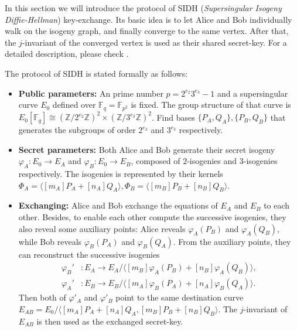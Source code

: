 

In this section we will introduce the protocol of SIDH (\textit{Supersingular Isogeny Diffie-Hellman}) key-exchange. Its basic idea is to let Alice and Bob individually walk on the isogeny graph, and finally converge to the same vertex. After that, the $j$-invariant of the converged vertex is used as their shared secret-key. For a detailed description, please check \cite{PQCRYPTO:JaoDeFo11}.

\begin{protocol}[SIDH] The protocol of SIDH is stated formally as follows:
\begin{itemize}
    \item \textbf{Public parameters: }An prime number $p=2^{e_2}3^{e_3}-1$ and a supersingular curve $E_0$ defined over $\mathbb F_q=\mathbb F_{p^2}$ is fixed. The group structure of that curve is $E_0[\mathbb F_q]\cong (\mathbb Z/2^{e_2}\mathbb Z)^2\times (\mathbb Z/3^{e_3}\mathbb Z)^2$. Find bases $\{P_A,Q_A\},\{P_B,Q_B\}$ that generates the subgroups of order $2^{e_2}$ and $3^{e_3}$ respectively.
    \item \textbf{Secret parameters: }Both Alice and Bob generate their secret isogeny $\varphi_A:E_0\to E_A$ and $\varphi_B:E_0\to E_B$, composed of $2$-isogenies and $3$-isogenies respectively. The isogenies is represented by their kernels $\Phi_A=\langle[m_A]P_A+[n_A]Q_A\rangle,\Phi_B=\langle[m_B]P_B+[n_B]Q_B\rangle$.
    \item \textbf{Exchanging: } Alice and Bob exchange the equations of $E_A$ and $E_B$ to each other. Besides, to enable each other compute the successive isogenies, they also reveal some auxiliary points: Alice reveals $\varphi_A(P_B)$ and $\varphi_A(Q_B)$, while Bob reveals $\varphi_B(P_A)$ and $\varphi_B(Q_A)$. From the auxiliary points, they can reconstruct the successive isogenies
    $$
    \begin{aligned}
    \varphi_B'&:E_A\to E_A/\langle[m_B]\varphi_A(P_B)+[n_B]\varphi_A(Q_B)\rangle,\\
    \varphi_A'&:E_B\to E_B/\langle[m_A]\varphi_B(P_A)+[n_A]\varphi_B(Q_A)\rangle.
    \end{aligned}
    $$
    Then both of $\varphi'_A$ and $\varphi'_B$ point to the same destination curve $E_{AB}=E_0/\langle[m_A]P_A+[n_A]Q_A,[m_B]P_B+[n_B]Q_B\rangle$. The $j$-invariant of $E_{AB}$ is then used as the exchanged secret-key.
\end{itemize}
\end{protocol}

